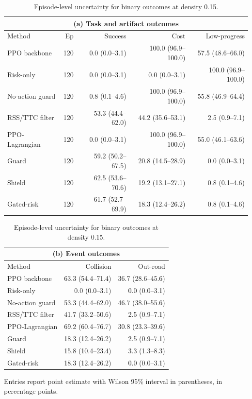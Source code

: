 \begin{table}[!htbp]
\centering
\caption{Episode-level uncertainty for binary outcomes at density 0.15.}
\label{tab_ci_binary}
\scriptsize
\setlength{\tabcolsep}{3.0pt}
\renewcommand{\arraystretch}{1.06}
\begin{tabular}{@{}lrrrr@{}}
\toprule
\multicolumn{5}{c}{(a) Task and artifact outcomes} \\
\midrule
Method & Ep & Success & Cost & Low-progress \\
\midrule
PPO backbone & 120 & 0.0 (0.0--3.1) & 100.0 (96.9--100.0) & 57.5 (48.6--66.0) \\
Risk-only & 120 & 0.0 (0.0--3.1) & 0.0 (0.0--3.1) & 100.0 (96.9--100.0) \\
No-action guard & 120 & 0.8 (0.1--4.6) & 100.0 (96.9--100.0) & 55.8 (46.9--64.4) \\
RSS/TTC filter & 120 & 53.3 (44.4--62.0) & 44.2 (35.6--53.1) & 2.5 (0.9--7.1) \\
PPO-Lagrangian & 120 & 0.0 (0.0--3.1) & 100.0 (96.9--100.0) & 55.0 (46.1--63.6) \\
Guard & 120 & 59.2 (50.2--67.5) & 20.8 (14.5--28.9) & 0.0 (0.0--3.1) \\
Shield & 120 & 62.5 (53.6--70.6) & 19.2 (13.1--27.1) & 0.8 (0.1--4.6) \\
Gated-risk & 120 & 61.7 (52.7--69.9) & 18.3 (12.4--26.2) & 0.8 (0.1--4.6) \\
\bottomrule
\end{tabular}

\vspace{3pt}
\begin{tabular}{@{}lrr@{}}
\toprule
\multicolumn{3}{c}{(b) Event outcomes} \\
\midrule
Method & Collision & Out-road \\
\midrule
PPO backbone & 63.3 (54.4--71.4) & 36.7 (28.6--45.6) \\
Risk-only & 0.0 (0.0--3.1) & 0.0 (0.0--3.1) \\
No-action guard & 53.3 (44.4--62.0) & 46.7 (38.0--55.6) \\
RSS/TTC filter & 41.7 (33.2--50.6) & 2.5 (0.9--7.1) \\
PPO-Lagrangian & 69.2 (60.4--76.7) & 30.8 (23.3--39.6) \\
Guard & 18.3 (12.4--26.2) & 2.5 (0.9--7.1) \\
Shield & 15.8 (10.4--23.4) & 3.3 (1.3--8.3) \\
Gated-risk & 18.3 (12.4--26.2) & 0.0 (0.0--3.1) \\
\bottomrule
\end{tabular}
\begin{tablenotes}
\item Entries report point estimate with Wilson 95\% interval in parentheses, in percentage points.
\end{tablenotes}
\end{table}
